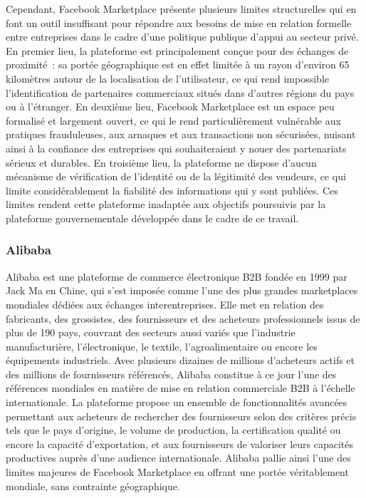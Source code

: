 \documentclass[12pt, a4paper, oneside]{report}
\begin{document}
Cependant, Facebook Marketplace présente plusieurs limites structurelles
qui en font un outil insuffisant pour répondre aux besoins de mise en
relation formelle entre entreprises dans le cadre d'une politique publique
d'appui au secteur privé. En premier lieu, la plateforme est principalement
conçue pour des échanges de proximité~: sa portée géographique est en
effet limitée à un rayon d'environ 65 kilomètres autour de la localisation
de l'utilisateur, ce qui rend impossible l'identification de partenaires
commerciaux situés dans d'autres régions du pays ou à l'étranger. En
deuxième lieu, Facebook Marketplace est un espace peu formalisé et
largement ouvert, ce qui le rend particulièrement vulnérable aux pratiques
frauduleuses, aux arnaques et aux transactions non sécurisées, nuisant
ainsi à la confiance des entreprises qui souhaiteraient y nouer des
partenariats sérieux et durables. En troisième lieu, la plateforme ne
dispose d'aucun mécanisme de vérification de l'identité ou de la
légitimité des vendeurs, ce qui limite considérablement la fiabilité des
informations qui y sont publiées. Ces limites rendent
cette plateforme inadaptée aux objectifs poursuivis par la plateforme
gouvernementale développée dans le cadre de ce travail.

\subsubsection{Alibaba}

Alibaba est une plateforme de commerce électronique B2B fondée en 1999
par Jack Ma en Chine, qui s'est imposée comme l'une des plus grandes
marketplaces mondiales dédiées aux échanges interentreprises. Elle met
en relation des fabricants, des grossistes, des fournisseurs et des
acheteurs professionnels issus de plus de 190 pays, couvrant des
secteurs aussi variés que l'industrie manufacturière, l'électronique,
le textile, l'agroalimentaire ou encore les équipements industriels.
Avec plusieurs dizaines de millions d'acheteurs actifs et des millions
de fournisseurs référencés, Alibaba constitue à ce jour l'une des
références mondiales en matière de mise en relation commerciale B2B
à l'échelle internationale\cite{alibaba2024}. La plateforme propose un ensemble de
fonctionnalités avancées permettant aux acheteurs de rechercher des
fournisseurs selon des critères précis tels que le pays d'origine,
le volume de production, la certification qualité ou encore la capacité
d'exportation, et aux fournisseurs de valoriser leurs capacités
productives auprès d'une audience internationale. Alibaba pallie ainsi
l'une des limites majeures de Facebook Marketplace en offrant une
portée véritablement mondiale, sans contrainte géographique.
\end{document}
